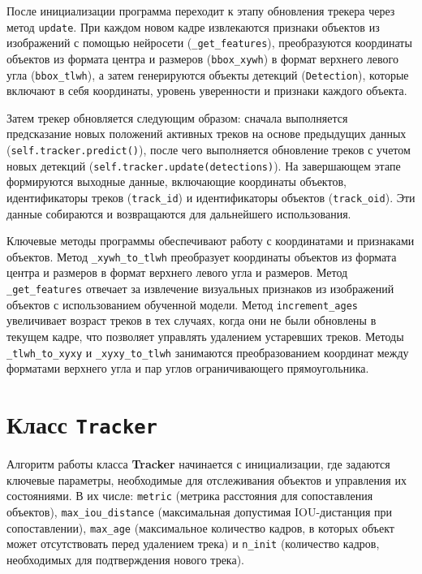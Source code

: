 После инициализации программа переходит к этапу обновления трекера через метод \lstinline:update:. При каждом новом кадре извлекаются признаки объектов из изображений с помощью нейросети (\lstinline:_get_features:), преобразуются координаты объектов из формата центра и размеров (\lstinline:bbox_xywh:) в формат верхнего левого угла (\lstinline:bbox_tlwh:), а затем генерируются объекты детекций (\lstinline:Detection:), которые включают в себя координаты, уровень уверенности и признаки каждого объекта.

Затем трекер обновляется следующим образом: сначала выполняется предсказание новых положений активных треков на основе предыдущих данных (\lstinline:self.tracker.predict():), после чего выполняется обновление треков с учетом новых детекций (\lstinline:self.tracker.update(detections):). На завершающем этапе формируются выходные данные, включающие координаты объектов, идентификаторы треков (\lstinline:track_id:) и идентификаторы объектов (\lstinline:track_oid:). Эти данные собираются и возвращаются для дальнейшего использования.

Ключевые методы программы обеспечивают работу с координатами и признаками объектов. Метод \lstinline:_xywh_to_tlwh: преобразует координаты объектов из формата центра и размеров в формат верхнего левого угла и размеров. Метод \lstinline:_get_features: отвечает за извлечение визуальных признаков из изображений объектов с использованием обученной модели. Метод \lstinline:increment_ages: увеличивает возраст треков в тех случаях, когда они не были обновлены в текущем кадре, что позволяет управлять удалением устаревших треков. Методы \lstinline:_tlwh_to_xyxy: и \lstinline:_xyxy_to_tlwh: занимаются преобразованием координат между форматами верхнего угла и пар углов ограничивающего прямоугольника.

\section{Класс \texttt{Tracker}}

Алгоритм работы класса \textbf{Tracker} начинается с инициализации, где задаются ключевые параметры, необходимые для отслеживания объектов и управления их состояниями. В их числе: \lstinline:metric: (метрика расстояния для сопоставления объектов), \lstinline:max_iou_distance: (максимальная допустимая IOU-дистанция при сопоставлении), \lstinline:max_age: (максимальное количество кадров, в которых объект может отсутствовать перед удалением трека) и \lstinline:n_init: (количество кадров, необходимых для подтверждения нового трека).

